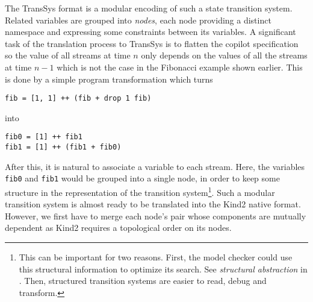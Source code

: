 The {TransSys} format is a modular encoding of such a state transition system. Related variables are grouped into \textit{nodes}, each node providing a distinct namespace and expressing some constraints between its variables. A significant task of the translation process to TransSys is to flatten the copilot specification so the value of all streams at time $n$ only depends on the values of all the streams at time $n - 1$ which is not the case in the Fibonacci example shown earlier. This is done by a simple program transformation which turns
\begin{lstlisting}
fib = [1, 1] ++ (fib + drop 1 fib)
\end{lstlisting}
into
\begin{lstlisting}
fib0 = [1] ++ fib1
fib1 = [1] ++ (fib1 + fib0)
\end{lstlisting}

After this, it is natural to associate a variable to each stream. Here, the variables \texttt{fib0} and \texttt{fib1} would be grouped into a single node, in order to keep some structure in the representation of the transition system\footnote{This can be important for two reasons. First, the model checker could use this structural information to optimize its search. See \emph{structural abstraction} in \cite{HagenPhD}. Then, structured transition systems are easier to read, debug and transform. }. Such a modular transition system is almost ready to be translated into the Kind2 native format. However, we first have to merge each node's pair whose components are mutually dependent as Kind2 requires a topological order on its nodes.





